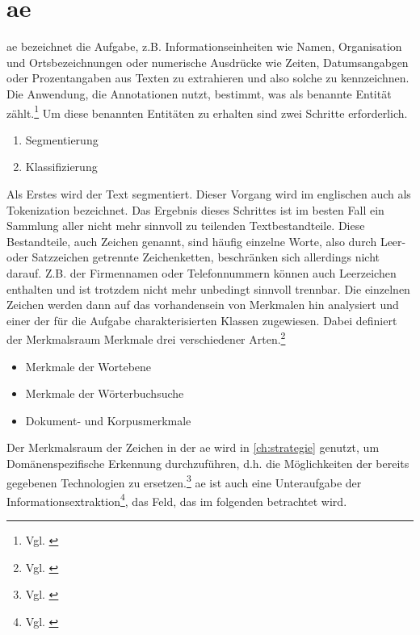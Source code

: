 \section{\Acrlong{ae}}
\gls{ae} bezeichnet die Aufgabe, z.B. Informationseinheiten wie Namen, Organisation und Ortsbezeichnungen oder numerische Ausdrücke wie Zeiten, Datumsangabgen oder Prozentangaben aus Texten zu extrahieren und also solche zu kennzeichnen.
Die Anwendung, die Annotationen nutzt, bestimmt, was als benannte Entität zählt.\footnote{Vgl. \cite{mikheev1999named}}
Um diese benannten Entitäten zu erhalten sind zwei Schritte erforderlich. 
\begin{enumerate}
	\item Segmentierung
	\item Klassifizierung
\end{enumerate}
Als Erstes wird der Text segmentiert. Dieser Vorgang wird im englischen auch als Tokenization bezeichnet.
Das Ergebnis dieses Schrittes ist im besten Fall ein Sammlung aller nicht mehr sinnvoll zu teilenden Textbestandteile. Diese Bestandteile, auch Zeichen genannt, sind häufig einzelne Worte, also durch Leer- oder Satzzeichen getrennte Zeichenketten, beschränken sich allerdings nicht darauf. Z.B. der Firmennamen oder Telefonnummern können auch Leerzeichen enthalten und ist trotzdem nicht mehr unbedingt sinnvoll trennbar.
Die einzelnen Zeichen werden dann auf das vorhandensein von Merkmalen hin analysiert und einer der für die Aufgabe charakterisierten Klassen zugewiesen.
Dabei definiert der Merkmalsraum Merkmale drei verschiedener Arten.\footnote{Vgl. \cite{manning2012information}}
\begin{itemize}
	\item Merkmale der Wortebene
	\item Merkmale der Wörterbuchsuche
	\item Dokument- und Korpusmerkmale
\end{itemize}
Der Merkmalsraum der Zeichen in der \gls{ae} wird in \autoref{ch:strategie} genutzt, um Domänenspezifische Erkennung durchzuführen, d.h. die Möglichkeiten der bereits gegebenen Technologien zu ersetzen.\footnote{Vgl. \cite{nadeau2007survey}} 
\gls{ae} ist auch eine Unteraufgabe der Informationsextraktion\footnote{Vgl. \cite{manning2012information}}, das Feld, das im folgenden betrachtet wird.

